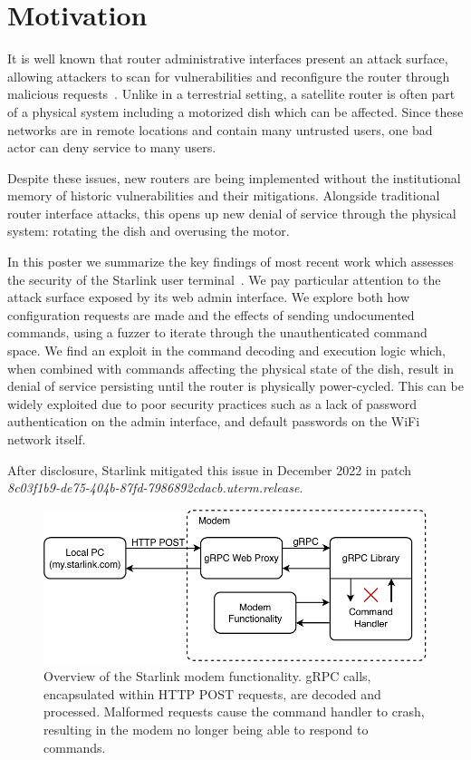 \section{Motivation}\label{sec:motivation}

It is well known that router administrative interfaces present an attack surface, allowing attackers to scan for vulnerabilities and reconfigure the router through malicious requests~\cite{niemietz2015owning,jeitner2022xdri}.
Unlike in a terrestrial setting, a satellite router is often part of a physical system including a motorized dish which can be affected.
Since these networks are in remote locations and contain many untrusted users, one bad actor can deny service to many users.

Despite these issues, new routers are being implemented without the institutional memory of historic vulnerabilities and their mitigations.
Alongside traditional router interface attacks, this opens up new denial of service through the physical system: rotating the dish and overusing the motor.

In this poster we summarize the key findings of most recent work which assesses the security of the Starlink user terminal~\cite{dishing-out-dos}.
We pay particular attention to the attack surface exposed by its web admin interface.
We explore both how configuration requests are made and the effects of sending undocumented commands, using a fuzzer to iterate through the unauthenticated command space.
We find an exploit in the command decoding and execution logic which, when combined with commands affecting the physical state of the dish, result in denial of service persisting until the router is physically power-cycled.
This can be widely exploited due to poor security practices such as a lack of password authentication on the admin interface, and default passwords on the WiFi network itself.

After disclosure, Starlink mitigated this issue in December 2022 in patch \textit{8c03f1b9-de75-404b-87fd-7986892cdacb.uterm.release}.


\begin{figure}
    \centering\includegraphics[width=\columnwidth]{img/modem.pdf}
    \caption{Overview of the Starlink modem functionality. gRPC calls, encapsulated within HTTP POST requests, are decoded and processed. Malformed requests cause the command handler to crash, resulting in the modem no longer being able to respond to commands.}
    \label{fig:modem}
    \vspace{-1em}
\end{figure}
